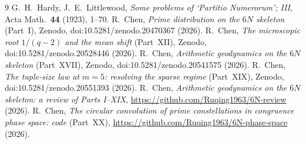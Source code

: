 \documentclass[11pt,a4paper]{article}
\begin{document}
\begin{thebibliography}{9}
 G.~H.~Hardy, J.~E.~Littlewood, \emph{Some problems of `Partitio
Numerorum'; III}, Acta Math.\ \textbf{44} (1923), 1--70.
 R.~Chen, \emph{Prime distribution on the $6N$ skeleton} (Part~I),
Zenodo, doi:10.5281/zenodo.20470367 (2026).
 R.~Chen, \emph{The microscopic root $1/(q-2)$ and the mean
shift} (Part~XII), Zenodo, doi:10.5281/zenodo.20528446 (2026).
 R.~Chen, \emph{Arithmetic geodynamics on the $6N$ skeleton}
(Part~XVII), Zenodo, doi:10.5281/zenodo.20541575 (2026).
 R.~Chen, \emph{The tuple-size law at $m=5$: resolving the sparse
regime} (Part~XIX), Zenodo, doi:10.5281/zenodo.20551393 (2026).
 R.~Chen, \emph{Arithmetic geodynamics on the $6N$ skeleton: a
review of Parts I--XIX}, \url{https://github.com/Ruqing1963/6N-review} (2026).
 R.~Chen, \emph{The circular convolution of prime constellations in
congruence phase space: code} (Part~XX),
\url{https://github.com/Ruqing1963/6N-phase-space} (2026).
\end{thebibliography}
\end{document}
